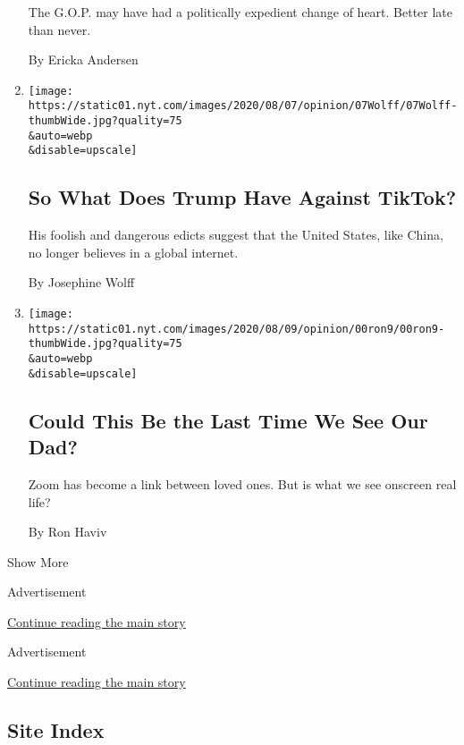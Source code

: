 \begin{enumerate}
  The G.O.P. may have had a politically expedient change of heart.
  Better late than never.

  By Ericka Andersen
\item
  \href{/2020/08/07/opinion/tiktok-wechat-china-trump-executive-order.html}{}

  \texttt{[image: https://static01.nyt.com/images/2020/08/07/opinion/07Wolff/07Wolff-thumbWide.jpg?quality=75\\\&auto=webp\\\&disable=upscale]}

  \hypertarget{so-what-does-trump-have-against-tiktok}{%
  \subsection{So What Does Trump Have Against
  TikTok?}\label{so-what-does-trump-have-against-tiktok}}

  His foolish and dangerous edicts suggest that the United States, like
  China, no longer believes in a global internet.

  By Josephine Wolff
\item
  \href{/2020/08/06/opinion/sunday/coronavirus-baruch-haviv-death.html}{}

  \texttt{[image: https://static01.nyt.com/images/2020/08/09/opinion/00ron9/00ron9-thumbWide.jpg?quality=75\\\&auto=webp\\\&disable=upscale]}

  \hypertarget{could-this-be-the-last-time-we-see-our-dad}{%
  \subsection{Could This Be the Last Time We See Our
  Dad?}\label{could-this-be-the-last-time-we-see-our-dad}}

  Zoom has become a link between loved ones. But is what we see onscreen
  real life?

  By Ron Haviv
\end{enumerate}

Show More

Advertisement

\protect\hyperlink{after-mid2}{Continue reading the main story}

Advertisement

\protect\hyperlink{after-mktg}{Continue reading the main story}

\hypertarget{site-index}{%
\subsection{Site Index}\label{site-index}}

